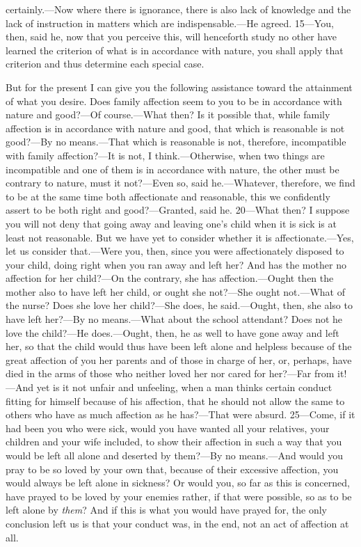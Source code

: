 certainly.—Now where there is ignorance, there is also lack of knowledge and the lack of instruction in matters which are indispensable.—He agreed. 15—You, then, said he, now that you perceive this, will henceforth study no other have learned the criterion of what is in accordance with nature, you shall apply that criterion and thus determine each special case.

But for the present I can give you the following assistance toward the attainment of what you desire. Does family affection seem to you to be in accordance with nature and good?—Of course.—What then? Is it possible that, while family affection is in accordance with nature and good, that which is reasonable is not good?—By no means.—That which is reasonable is not, therefore, incompatible with family affection?—It is not, I think.—Otherwise, when two things are incompatible and one of them is in accordance with nature, the other must be contrary to nature, must it not?—Even so, said he.—Whatever, therefore, we find to be at the same time both affectionate and reasonable, this we confidently assert to be both right and good?—Granted, said he. 20—What then? I suppose you will not deny that going away and leaving one's child when it is sick is at least not reasonable. But we have yet to consider whether it is affectionate.—Yes, let us consider that.—Were you, then, since you were affectionately disposed to your child, doing right when you ran away and left her? And has the mother no affection for her child?—On the contrary, she has affection.—Ought then the mother also to have left her child, or ought she not?—She ought not.—What of the nurse? Does she love her child?—She does, he said.—Ought, then, she also to have left her?—By no means.—What about the school attendant? Does not he love the child?—He does.—Ought, then, he as well to have gone away and left her, so that the child would thus have been left alone and helpless because of the great affection of you her parents and of those in charge of her, or, perhaps, have died in the arms of those who neither loved her nor cared for her?—Far from it!—And yet is it not unfair and unfeeling, when a man thinks certain conduct fitting for himself because of his affection, that he should not allow the same to others who have as much affection as he has?—That were absurd. 25—Come, if it had been you who were sick, would you have wanted all your relatives, your children and your wife included, to show their affection in such a way that you would be left all alone and deserted by them?—By no means.—And would you pray to be so loved by your own that, because of their excessive affection, you would always be left alone in sickness? Or would you, so far as this is concerned, have prayed to be loved by your enemies rather, if that were possible, so as to be left alone by \emph{them}? And if this is what you would have prayed for, the only conclusion left us is that your conduct was, in the end, not an act of affection at all.


